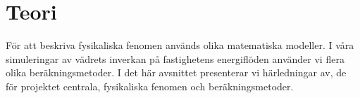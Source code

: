 \section{Teori}

För att beskriva fysikaliska fenomen används olika matematiska modeller. I våra simuleringar av vädrets inverkan på fastighetens energiflöden använder vi flera olika beräkningsmetoder. I det här avsnittet presenterar vi härledningar av, de för projektet centrala, fysikaliska fenomen och beräkningsmetoder.













